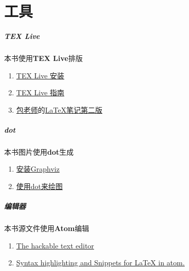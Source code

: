\chapter{工具}

\paragraph{TEX Live}
本书使用\textbf{TEX Live}排版
\begin{enumerate}
  \item \href{https://wiki.archlinux.org/index.php/TeX_Live_(%E7%AE%80%E4%BD%93%E4%B8%AD%E6%96%87)}{TEX Live 安装}
  \item \href{https://www.tug.org/texlive/doc/texlive-zh-cn/texlive-zh-cn.pdf}{TEX Live 指南}
  \item \href{http://www.dralpha.com/zh/index.htm}{包老师}的\href{http://dralpha.altervista.org/zh/tech/lnotes2.pdf}{LaTeX笔记第二版}
\end{enumerate}

\paragraph{dot}
本书图片使用\textbf{dot}生成
\begin{enumerate}
  \item \href{https://wiki.archlinux.org/index.php/Graphviz}{安装Graphviz}
  \item \href{http://www.jianshu.com/p/5b02445eca1d}{使用dot来绘图}
\end{enumerate}

\paragraph{编辑器}
本书源文件使用\textbf{Atom}编辑
\begin{enumerate}
  \item \href{https://github.com/atom/atom}{The hackable text editor}
  \item \href{https://atom.io/packages/language-latex}{Syntax highlighting and Snippets for LaTeX in atom.}  
\end{enumerate}
